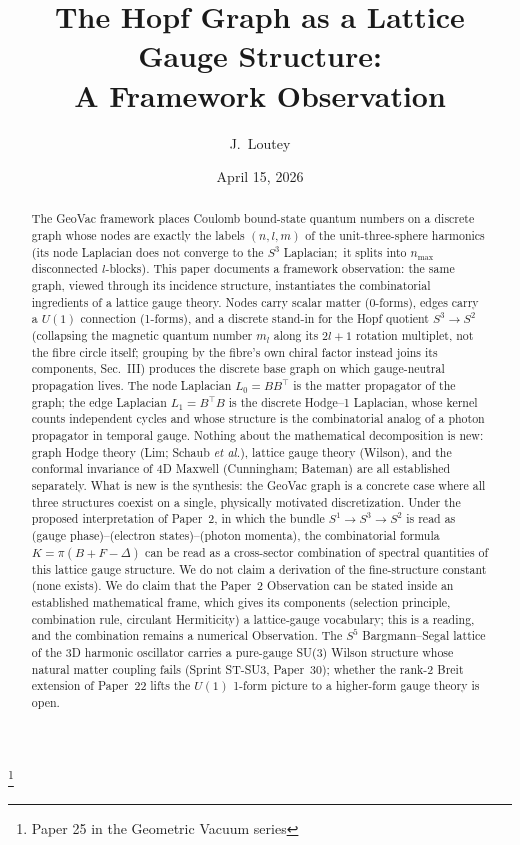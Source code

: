\documentclass[aps,pra,twocolumn,superscriptaddress,longbibliography]{revtex4-2}
\begin{document}
\title{The Hopf Graph as a Lattice Gauge Structure:\\
A Framework Observation}
\thanks{Paper 25 in the Geometric Vacuum series}

\author{J.~Loutey}

\date{April 15, 2026}


\begin{abstract}
The GeoVac framework places Coulomb bound-state quantum numbers on a
discrete graph whose nodes are exactly the labels $(n,l,m)$ of the
unit-three-sphere harmonics (its node Laplacian does not converge to
the $S^3$ Laplacian;\ it splits into $n_{\max}$ disconnected
$l$-blocks).  This paper documents a framework observation: the
same graph, viewed through its incidence structure, instantiates the
combinatorial ingredients of a lattice gauge theory.  Nodes carry
scalar matter (0-forms), edges carry a $U(1)$ connection (1-forms),
and a discrete stand-in for the Hopf quotient $S^3 \to S^2$
(collapsing the magnetic quantum number $m_l$ along its $2l+1$
rotation multiplet, not the fibre circle itself; grouping by the fibre's
own chiral factor instead joins its components, Sec.~III) produces the discrete base graph
on which gauge-neutral propagation lives.  The node Laplacian
$L_0 = B B^{\top}$ is the matter propagator of the graph; the edge
Laplacian $L_1 = B^{\top} B$ is the discrete Hodge--1 Laplacian, whose
kernel counts independent cycles and whose structure is the
combinatorial analog of a photon propagator in temporal gauge.
Nothing about the mathematical decomposition is new: graph Hodge
theory (Lim; Schaub \emph{et al.}), lattice gauge theory (Wilson), and
the conformal invariance of 4D Maxwell (Cunningham; Bateman) are all
established separately.  What is new is the synthesis: the GeoVac
graph is a concrete case where all three structures coexist on a
single, physically motivated discretization.  Under the proposed
interpretation of Paper~2, in which the bundle
$S^1 \to S^3 \to S^2$ is read as
(gauge phase)--(electron states)--(photon momenta), the
combinatorial formula $K = \pi(B + F - \Delta)$ can be read as a
cross-sector combination of spectral quantities of this lattice gauge structure.  We
do not claim a derivation of the fine-structure constant (none exists).  We do
claim that the Paper~2 Observation can be stated inside an established
mathematical frame, which gives its components (selection principle,
combination rule, circulant Hermiticity) a lattice-gauge vocabulary;
this is a reading, and the combination remains a numerical Observation.
The $S^5$ Bargmann--Segal lattice of the 3D harmonic oscillator carries
a pure-gauge SU(3) Wilson structure whose natural matter coupling
fails (Sprint ST-SU3, Paper~30); whether the rank-2 Breit extension of
Paper~22 lifts the $U(1)$ 1-form picture to a higher-form gauge theory
is open.
\end{abstract}
\end{document}
